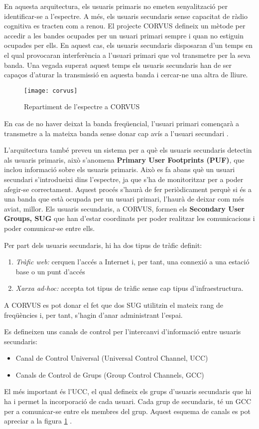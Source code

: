 \documentclass[10pt,journal,a4paper]{IEEEtran}
\begin{document}
En aquesta arquitectura, els usuaris primaris no emeten senyalització per identificar-se a l'espectre. A més, els usuaris secundaris sense capacitat de ràdio cognitiva es tracten com a renou.
El projecte CORVUS defineix un mètode per accedir a les bandes ocupades per un usuari primari sempre i quan no estiguin ocupades per ells. En aquest cas, els usuaris secundaris disposaran d'un temps en el qual provocaran interferència a l'usuari primari que vol transmetre per la seva banda. Una vegada superat aquest temps els usuaris secundaris han de ser capaços d'aturar la transmissió en aquesta banda  i cercar-ne una altra de lliure.
\begin{figure}
\centering
\texttt{[image: corvus]}
\caption{Repartiment de l'espectre a CORVUS}
\label{ref:corvus}
\end{figure}

En cas de no haver deixat la banda freqüencial, l'usuari primari començarà a transmetre a la mateixa banda sense donar cap avís a l'usuari secundari \cite{corvus}. 

L'arquitectura també preveu un sistema per a què els usuaris secundaris detectin als usuaris primaris, això s'anomena \textbf{Primary User Footprints (PUF)}, que inclou informació  sobre els usuaris primaris. Això es fa abans què un usuari secundari s'introdueixi dins l'espectre, ja que s'ha de monitoritzar per a poder afegir-se correctament. Aquest procés s'haurà de fer periòdicament perquè si és a una banda que està ocupada per un usuari primari, l'haurà de deixar com més aviat, millor.
Els usuaris secundaris, a CORVUS, formen els \textbf{Secondary User Groups, SUG} que han d'estar coordinats per poder realitzar les comunicacions i poder comunicar-se entre ells.

Per part dels usuaris secundaris, hi ha dos tipus de tràfic definit:
\begin{enumerate}
\item \emph{Tràfic web:} cerquen l'accés a Internet i, per tant, una connexió a una estació base o un punt d'accés
\item \emph{Xarxa ad-hoc:} accepta tot tipus de tràfic sense cap tipus d'infraestructura.
\end{enumerate}
A CORVUS es pot donar el fet que dos SUG utilitzin el mateix rang de freqüències i, per tant, s'hagin d'anar administrant l'espai.

Es defineixen uns canals de control per l'intercanvi d'informació entre usuaris secundaris:
\begin{itemize}
\item Canal de Control Universal (Universal Control Channel, UCC)
\item Canals de Control de Grups (Group Control Channels, GCC)
\end{itemize}
El més important és l'UCC, el qual defineix els grups d'usuaris secundaris que hi ha i permet la incorporació de cada usuari. Cada grup de secundaris, té un GCC per a comunicar-se entre els membres del grup.
Aquest esquema de canals es pot apreciar a la figura \ref{ref:corvus} \cite{corvus}.
\end{document}
